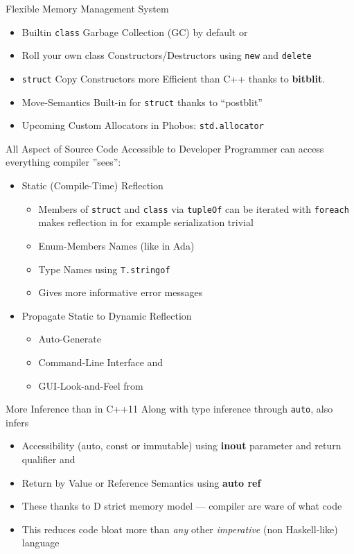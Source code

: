 \documentclass[xcolor=dvipsnames]{beamer}
\begin{document}
\begin{frame}[fragile]{Flexible Memory Management System}
  \begin{itemize}[<+->]
  \item Builtin \texttt{class} Garbage Collection (GC) by default  or
  \item Roll your own class Constructors/Destructors using \texttt{new} and
    \texttt{delete}
  \item \texttt{struct} Copy Constructors more Efficient than C++ thanks to
    \textbf{bitblit}.
  \item Move-Semantics Built-in for \texttt{struct} thanks to “postblit”
  \item Upcoming Custom Allocators in Phobos:  \texttt{std.allocator}
  \end{itemize}
\end{frame}

\begin{frame}[fragile]{All Aspect of Source Code Accessible to Developer}
  Programmer can access everything compiler ”sees”:
  \begin{itemize}[<+->]
  \item Static (Compile-Time) Reflection
    \begin{itemize}[<+->]
    \item Members of \texttt{struct} and \texttt{class} via \texttt{tupleOf} can
      be iterated with \texttt{foreach} makes reflection in for example
      serialization trivial
    \item Enum-Members Names (like in Ada)
    \item Type Names using \texttt{T.stringof}
    \item Gives more informative error messages
    \end{itemize}
  \item Propagate Static to Dynamic Reflection
    \begin{itemize}[<+->]
    \item Auto-Generate
    \item Command-Line Interface and
    \item GUI-Look-and-Feel from
    \end{itemize}
  \end{itemize}
\end{frame}

\begin{frame}[fragile]{More Inference than in C++11}
  Along with type inference through \texttt{auto}, also infers
  \begin{itemize}[<+->]
  \item Accessibility (auto, const or immutable) using \textbf{inout} parameter
    and return qualifier and
  \item Return by Value or Reference Semantics using \textbf{auto ref}
  \item These thanks to D strict memory model --- compiler are ware of what code
  \item This reduces code bloat more than \emph{any} other \emph{imperative}
    (non Haskell-like) language
  \end{itemize}
\end{frame}
\end{document}
